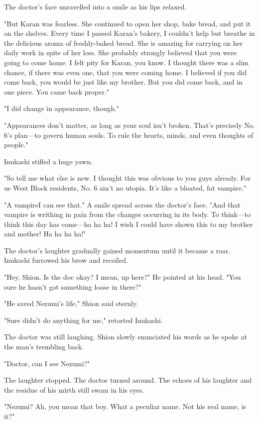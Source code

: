 The doctor's face unravelled into a smile as his lips relaxed.

"But Karan was fearless. She continued to open her shop, bake bread, and
put it on the shelves. Every time I passed Karan's bakery, I couldn't
help but breathe in the delicious aroma of freshly-baked bread. She is
amazing for carrying on her daily work in spite of her loss. She
probably strongly believed that you were going to come home. I felt pity
for Karan, you know. I thought there was a slim chance, if there was
even one, that you were coming home. I believed if you did come back,
you would be just like my brother. But you did come back, and in one
piece. You came back proper."

"I did change in appearance, though."

"Appearances don't matter, as long as your soul isn't broken. That's
precisely No. 6's plan---to govern human souls. To rule the hearts, minds,
and even thoughts of people."

Inukashi stifled a huge yawn.

"So tell me what else is new. I thought this was obvious to you guys
already. For us West Block residents, No. 6 ain't no utopia. It's like a
bloated, fat vampire."

"A vampire\el I can see that." A smile spread across the doctor's face.
"And that vampire is writhing in pain from the changes occurring in its
body. To think---to think this day has come---ha ha ha! I wish I could have
shown this to my brother and mother! Ha ha ha ha!"

The doctor's laughter gradually gained momentum until it became a roar.
Inukashi furrowed his brow and recoiled.

"Hey, Shion. Is the doc okay? I mean, up here?" He pointed at his head.
"You sure he hasn't got something loose in there?"

"He saved Nezumi's life," Shion said sternly.

"Sure didn't do anything for me," retorted Inukashi.

The doctor was still laughing. Shion slowly enunciated his words as he
spoke at the man's trembling back.

"Doctor, can I see Nezumi?"

The laughter stopped. The doctor turned around. The echoes of his
laughter and the residue of his mirth still swam in his eyes.

"Nezumi? Ah, you mean that boy. What a peculiar name. Not his real name,
is it?"

